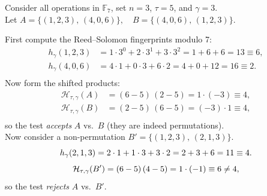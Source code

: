 \documentclass{zkdl-presentation-template}
\begin{document}
    \begin{frame}
        \begin{example}
            Consider all operations in $\mathbb{F}_7$, set $n=3$, $\tau=5$, and $\gamma=3$.\\
            Let $A = \{(1,2,3),\,(4,0,6)\}, \quad B = \{(4,0,6),\,(1,2,3)\}.$
            
            \pause
            \vspace{5px}
            First compute the Reed–Solomon fingerprints modulo 7:
            \vspace{-7px}
            \begin{align*}
                h_{\gamma}(1,2,3) &=1\cdot3^0 + 2\cdot3^1 + 3\cdot3^2 =1 + 6 + 6 =13 \equiv 6,\\
                h_{\gamma}(4,0,6) &=4\cdot1 + 0\cdot3 + 6\cdot2 =4 + 0 + 12 =16 \equiv 2. \\[-23pt]
            \end{align*}
            \pause
            Now form the shifted products:
            \vspace{-7px}
            \begin{align*}
                \mathcal{H}_{\tau,\gamma}(A) &=(6-5)\,(2-5) =1\cdot(-3)\equiv4,\\
                \mathcal{H}_{\tau,\gamma}(B) &=(2-5)\,(6-5) =(-3)\cdot1\equiv4,\\[-23pt]
            \end{align*}
            so the test \emph{accepts} $A$ vs.\ $B$ (they are indeed permutations). \\
            
            \pause
            \vspace{5px}
            Now consider a non-permutation $B' = \{(1,2,3),\,(2,1,3)\}.$
            \vspace{-5px}
            \begin{equation*}
                h_{\gamma}(2,1,3) =2\cdot1 + 1\cdot3 + 3\cdot2 =2 + 3 + 6 =11 \equiv 4.
                \vspace{-10px}
            \end{equation*}
            \begin{equation*}
                \mathcal{H}_{\tau,\gamma}(B') =(6-5)\,(4-5) =1\cdot(-1)\equiv6\neq4,
                \vspace{-5px}
            \end{equation*}
            so the test \emph{rejects} $A$ vs.\ $B'$.  
        \end{example}
    \end{frame}
\end{document}
